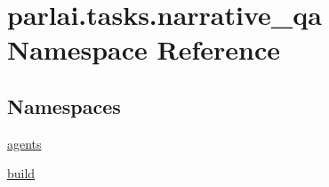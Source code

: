 \hypertarget{namespaceparlai_1_1tasks_1_1narrative__qa}{}\section{parlai.\+tasks.\+narrative\+\_\+qa Namespace Reference}
\label{namespaceparlai_1_1tasks_1_1narrative__qa}
\subsection*{Namespaces}
\begin{DoxyCompactItemize}
\item 
 \hyperlink{namespaceparlai_1_1tasks_1_1narrative__qa_1_1agents}{agents}
\item 
 \hyperlink{namespaceparlai_1_1tasks_1_1narrative__qa_1_1build}{build}
\end{DoxyCompactItemize}
